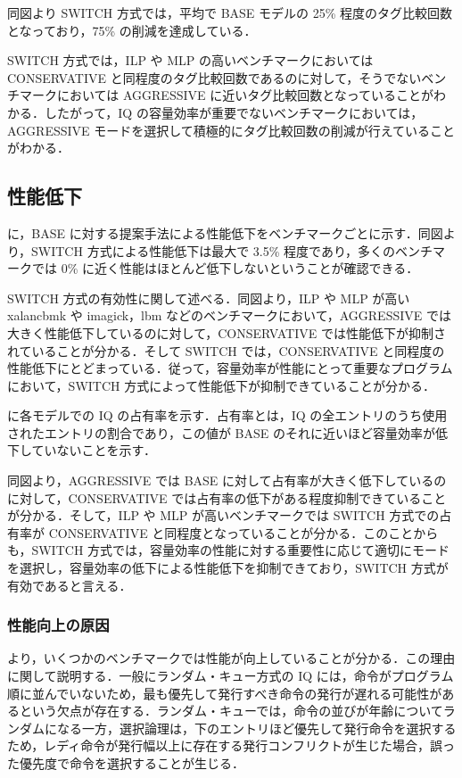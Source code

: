 同図より SWITCH 方式では，平均で BASE モデルの 25\% 程度のタグ比較回数となっており，75\% の削減を達成している．

SWITCH 方式では，ILP や MLP の高いベンチマークにおいては CONSERVATIVE と同程度のタグ比較回数であるのに対して，そうでないベンチマークにおいては AGGRESSIVE に近いタグ比較回数となっていることがわかる．したがって，IQ の容量効率が重要でないベンチマークにおいては，AGGRESSIVE モードを選択して積極的にタグ比較回数の削減が行えていることがわかる．

\subsection{性能低下}
に，BASE に対する提案手法による性能低下をベンチマークごとに示す．同図より，SWITCH 方式による性能低下は最大で 3.5\% 程度であり，多くのベンチマークでは 0\% に近く性能はほとんど低下しないということが確認できる．

SWITCH 方式の有効性に関して述べる．同図より，ILP や MLP が高い xalancbmk や imagick，lbm などのベンチマークにおいて，AGGRESSIVE では大きく性能低下しているのに対して，CONSERVATIVE では性能低下が抑制されていることが分かる．そして SWITCH では，CONSERVATIVE と同程度の性能低下にとどまっている．従って，容量効率が性能にとって重要なプログラムにおいて，SWITCH 方式によって性能低下が抑制できていることが分かる．

に各モデルでの IQ の占有率を示す．占有率とは，IQ の全エントリのうち使用されたエントリの割合であり，この値が BASE のそれに近いほど容量効率が低下していないことを示す．

同図より，AGGRESSIVE では BASE に対して占有率が大きく低下しているのに対して，CONSERVATIVE では占有率の低下がある程度抑制できていることが分かる．そして，ILP や MLP が高いベンチマークでは SWITCH 方式での占有率が CONSERVATIVE と同程度となっていることが分かる．このことからも，SWITCH 方式では，容量効率の性能に対する重要性に応じて適切にモードを選択し，容量効率の低下による性能低下を抑制できており，SWITCH 方式が有効であると言える．

\subsubsection{性能向上の原因}
より，いくつかのベンチマークでは性能が向上していることが分かる．この理由に関して説明する．一般にランダム・キュー方式の IQ には，命令がプログラム順に並んでいないため，最も優先して発行すべき命令の発行が遅れる可能性があるという欠点が存在する．ランダム・キューでは，命令の並びが年齢についてランダムになる一方，選択論理は，下のエントリほど優先して発行命令を選択するため，レディ命令が発行幅以上に存在する発行コンフリクトが生じた場合，誤った優先度で命令を選択することが生じる．

